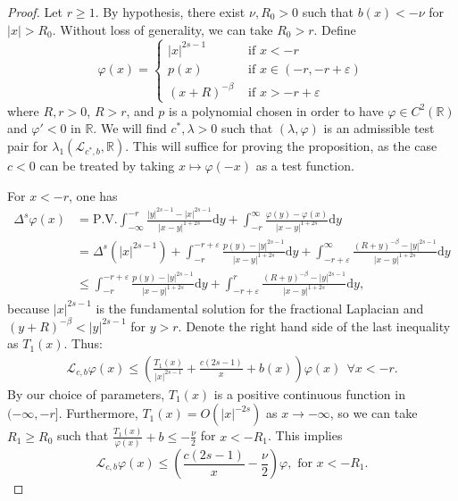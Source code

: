 \documentclass[11pt,a4paper]{amsart}
\newcommand{\Lop}{\mathcal{L}}
\newcommand{\R}{\mathbb{R}}
\newcommand{\PV}{\mathrm{P.V.}}
\newcommand{\dy}{\mathrm{d}y}
\renewcommand{\phi}{\varphi}
\renewcommand{\epsilon}{\varepsilon}
\begin{document}
\begin{proof}
Let $r\geq 1$. By hypothesis, there exist $\nu, R_0 >0$ such that $b(x) < - \nu$ for $|x| > R_0$. Without loss of generality, we can take $R_0 > r$. Define 
\[\phi(x) = \begin{cases}
|x|^{2s-1} & \text{ if } x < -r \\
p(x) & \text{ if } x  \in (-r, - r + \epsilon )\\
(x+ R)^{-\beta} & \text{ if } x > - r + \epsilon
\end{cases} \]
where $R, r > 0$, $R> r$, and $p$ is a polynomial chosen in order to have $\phi \in C^2(\R)$ and $\phi' < 0$ in $\R$. We will find $c^*, \lambda>0$ such that $(\lambda, \phi)$ is an admissible test pair for $\lambda_1(\Lop_{c^*,b},\R)$. This will suffice for proving the proposition, as the case $c <0$ can be treated by taking $x\mapsto \phi(-x)$ as a test function.

For $x<-r$, one has 
\begin{align*}
\Delta^s\phi(x) &= \PV \int_{-\infty}^{-r} \frac{|y|^{2s-1} - |x|^{2s-1}}{|x-y|^{1+2s}}\dy + \int_{-r}^{\infty} \frac{\phi(y) - \phi(x)}{|x-y|^{1+2s}}\dy \\
&= \Delta^s(|x|^{2s-1}) +\int_{-r}^{-r+\epsilon} \frac{p(y) - |y|^{2s-1}}{|x-y|^{1+2s}}\dy + \int_{-r +\epsilon}^{\infty} \frac{(R+y)^{-\beta} - |y|^{2s-1}}{|x-y|^{1+2s}}\dy \\
&\leq \int_{-r}^{-r+\epsilon} \frac{p(y) - |y|^{2s-1}}{|x-y|^{1+2s}}\dy + \int_{-r+\epsilon}^{r} \frac{(R+y)^{-\beta} - |y|^{2s-1}}{|x-y|^{1+2s}}\dy,
\end{align*}
because $|x|^{2s-1}$ is the fundamental solution for the fractional Laplacian and $(y+R)^{-\beta} < |y|^{2s-1}$ for $y>r$. Denote the right hand side of the last inequality as $T_1(x)$. Thus:
\begin{align*}
\Lop_{c,b} \phi(x) \leq \left( \frac{T_1(x)}{|x|^{2s-1}} + \frac{c(2s-1)}{x} + b(x)\right)\phi(x) ~~\forall x<-r.
\end{align*}
By our choice of parameters, $T_1(x)$ is a positive continuous function in $(-\infty, -r]$. Furthermore, $T_1(x) = O(|x|^{-2s})$ as $x\rightarrow -\infty$, so we can take $R_1 \geq R_0$ such that $\frac{T_1(x)}{\phi(x)} + b \leq -\frac{\nu}{2}$ for $x < -R_1$. This implies 
\begin{equation}
\label{eq:bound_left}
\Lop_{c, b} \phi(x) \leq \left(\frac{c(2s-1)}{x} - \frac{\nu}{2}\right) \phi, \text{ for } x<-R_1.
\end{equation} 


\end{proof}
\end{document}
